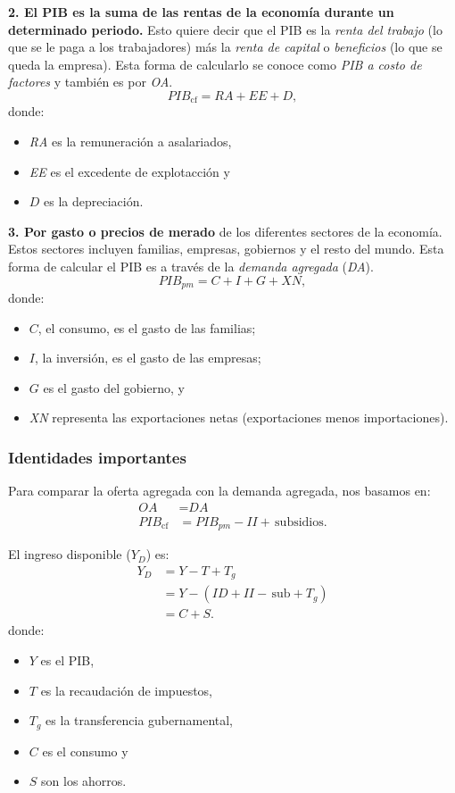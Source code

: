 \documentclass[10pt, landscape]{article}
\begin{document}
\begin{multicols*}{3}
\textbf{2. El PIB es la suma de las rentas de la economía durante un determinado periodo.} Esto quiere decir que el PIB es la \textit{renta del trabajo} (lo que se le paga a los trabajadores) más la \textit{renta de capital} o \textit{beneficios} (lo que se queda la empresa). Esta forma de calcularlo se conoce como \textit{PIB a costo de factores} y también es por \textit{OA}.
\[ \textit{PIB}_{\text{cf}} = \textit{RA} + \textit{EE} + D,\]
donde:
\begin{itemize}
    \item \textit{RA} es la remuneración a asalariados,
    \item \textit{EE} es el excedente de explotacción y
    \item $D$ es la depreciación.
\end{itemize}

\textbf{3. Por gasto o precios de merado} de los diferentes sectores de la economía. Estos sectores incluyen familias, empresas, gobiernos y el resto del mundo. Esta forma de calcular el PIB es a través de la \textit{demanda agregada} (\textit{DA}).
\[ \textit{PIB}_{\textit{pm}} = C + I + G + \textit{XN}, \]
donde:
\begin{itemize}
    \item $C$, el consumo, es el gasto de las familias;
    \item $I$, la inversión, es el gasto de las empresas;
    \item $G$ es el gasto del gobierno, y
    \item \textit{XN} representa las exportaciones netas (exportaciones menos importaciones).
\end{itemize}

\subsubsection{Identidades importantes}
Para comparar la oferta agregada con la demanda agregada, nos basamos en:
\begin{align*}
    \textit{OA} &= \textit{DA} \\
    \textit{PIB}_{\text{cf}} &= \textit{PIB}_{\textit{pm}} - \textit{II} + \,\textrm{subsidios}.
\end{align*}

El ingreso disponible ($Y_D$) es:
\begin{align*}
    Y_D &= Y - T + T_g \\
        &= Y - (\textit{ID} + \textit{II} - \,\textrm{sub} + T_g) \\
        &= C + S.
\end{align*}
donde:
\begin{itemize}
    \item $Y$ es el PIB,
    \item $T$ es la recaudación de impuestos,
    \item $T_g$ es la transferencia gubernamental,
    \item $C$ es el consumo y
    \item $S$ son los ahorros.
\end{itemize}


\end{multicols*}
\end{document}
